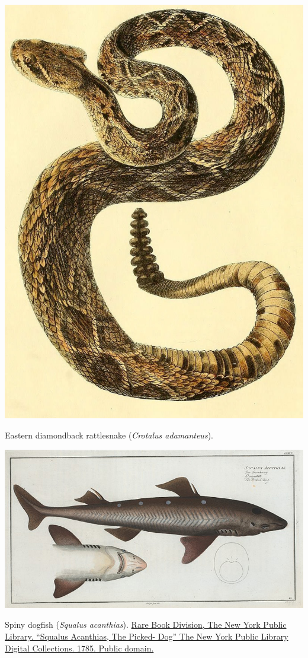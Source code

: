 \begin{marginfigure}[-2cm]
\begin{center}
\includegraphics[width= 0.7 \textwidth]{illustration_images/Genetic_drift/rattlesnake/rattlesnake.jpg}
\end{center}
\caption{Eastern diamondback rattlesnake ({\it Crotalus adamanteus}).  } \label{fig:rattlesnake}
\end{marginfigure}

\begin{marginfigure}
\begin{center}
\includegraphics[width= \textwidth]{illustration_images/Genetic_drift/dogfish/dogfish.jpg}
\end{center}
\caption{Spiny dogfish ({\it Squalus acanthias}). \newline \noindent \tiny{ \href{http://digitalcollections.nypl.org/items/510d47da-6930-a3d9-e040-e00a18064a99}{Rare Book Division, The New York Public Library. ``Squalus Acanthias, The Picked- Dog'' The New York Public Library Digital Collections. 1785. Public domain.}}}
\label{fig:dogfish}
\end{marginfigure}

